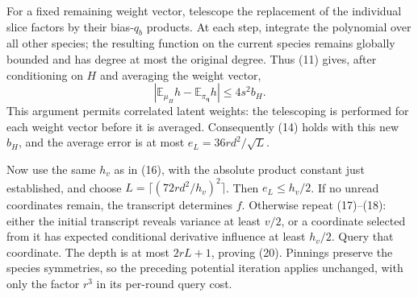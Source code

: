 For a fixed remaining weight vector, telescope the replacement of the
individual slice factors by their bias-\(q_b\) products. At each step,
integrate the polynomial over all other species; the resulting function
on the current species remains globally bounded and has degree at most
the original degree. Thus (11) gives, after conditioning on \(H\) and
averaging the weight vector, \[
 |\mathbb E_{\mu_H}h-\mathbb E_{\pi_{\mathbf q}}h|
 \le4s^2b_H.                                           \tag{23}
\] This argument permits correlated latent weights: the telescoping is
performed for each weight vector before it is averaged. Consequently
(14) holds with this new \(b_H\), and the average error is at most
\(e_L=36rd^2/\sqrt L\).

Now use the same \(h_v\) as in (16), with the absolute product constant
just established, and choose \(L=\lceil(72rd^2/h_v)^2\rceil\). Then
\(e_L\le h_v/2\). If no unread coordinates remain, the transcript
determines \(f\). Otherwise repeat (17)--(18): either the initial
transcript reveals variance at least \(v/2\), or a coordinate selected
from it has expected conditional derivative influence at least
\(h_v/2\). Query that coordinate. The depth is at most \(2rL+1\),
proving (20). Pinnings preserve the species symmetries, so the preceding
potential iteration applies unchanged, with only the factor \(r^3\) in
its per-round query cost.
